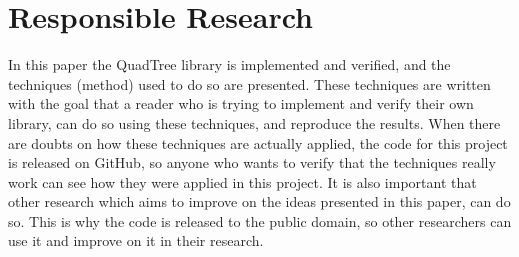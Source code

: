 \section{Responsible Research}
In this paper the QuadTree library is implemented and verified, and the techniques (method) used to do so are presented. These techniques are written with the goal that a reader who is trying to implement and verify their own library, can do so using these techniques, and reproduce the results. When there are doubts on how these techniques are actually applied, the code for this project is released on GitHub, so anyone who wants to verify that the techniques really work can see how they were applied in this project. It is also important that other research which aims to improve on the ideas presented in this paper, can do so. This is why the code is released to the public domain, so other researchers can use it and improve on it in their research.